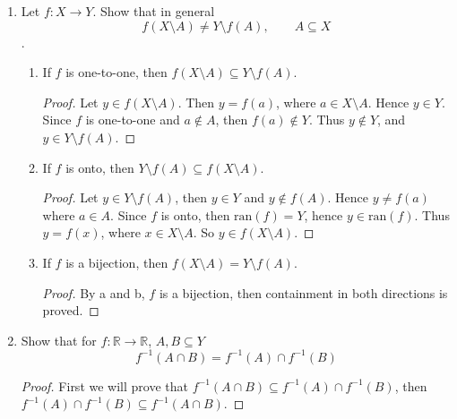 \documentclass[12pt]{article}
\begin{document}
\begin{enumerate}
\begin{enumerate}
\begin{proof}
				Next we will prove that $[-2,-1]\cup [1,2]\subseteq f^{-1}([2,17])$. Let $x\in [-2,-1]\cup [1,2]$. Let $y=x^4+1$, then the range of $y$ is $[2,17]$. Hence $x\in f^{-1}([2,17])$.
				
				Since containment was proved in both directions, equality is shown.
			\end{proof}
			
		\end{enumerate}
			
			\item Let $f:X\to Y$. Show that in general
			\[
			f(X\setminus A)\neq Y\setminus f(A),\qquad A\subseteq X
			\].
			
			\begin{enumerate}
				\item If $f$ is one-to-one, then $f(X\setminus A)\subseteq Y\setminus f(A)$.
				
				\begin{proof}
					Let $y\in f(X\setminus A)$. Then $y=f(a)$, where $a\in X\setminus A$. Hence $y\in Y$. Since $f$ is one-to-one and $a\notin A$, then $f(a)\notin Y$. Thus $y\notin Y$, and $y\in Y\setminus f(A)$.
				\end{proof}
				
				\item If $f$ is onto, then $Y\setminus f(A)\subseteq f(X\setminus A)$.
				
				\begin{proof}
					Let $y\in Y\setminus f(A)$, then $y\in Y$ and $y\notin f(A)$. Hence $y\neq f(a)$ where $a\in A$. Since $f$ is onto, then $\text{ran}(f)=Y$, hence $y\in \text{ran}(f)$. Thus $y=f(x)$, where $x\in X\setminus A$. So $y\in f(X\setminus A)$.
				\end{proof}
			
				\item If $f$ is a bijection, then $f(X\setminus A)= Y\setminus f(A)$.
				
				\begin{proof}
					By a and b, $f$ is a bijection, then containment in both directions is proved.
				\end{proof}
			\end{enumerate}
		
		\newpage
		
		\item Show that for $f:\mathbb{R}\to\mathbb{R}$, $A, B\subseteq Y$
		\[
		f^{-1}(A\cap B)=f^{-1}(A)\cap f^{-1}(B)
		\]
			
		\begin{proof}
			First we will prove that $f^{-1}(A\cap B)\subseteq f^{-1}(A)\cap f^{-1}(B)$, then $f^{-1}(A)\cap f^{-1}(B)\subseteq f^{-1}(A\cap B)$.
			

\end{proof}
\end{enumerate}
\end{document}
